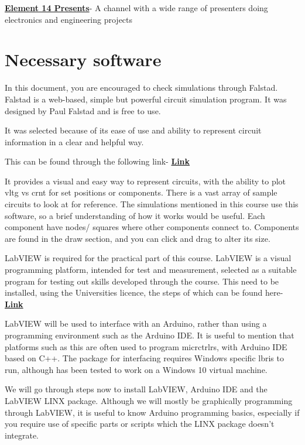 \documentclass[a4paper,11pt]{report}
\let\oldhref\href %
\renewcommand{\href}[2]{\oldhref{#1}{\bfseries#2}}
\begin{document}
\href{https://www.youtube.com/c/element14presents/videos}{Element 14 Presents}- A channel with a wide range of presenters doing electronics and engineering projects

\pagebreak

\section{Necessary software}

In this document, you are encouraged to check simulations through Falstad. Falstad is a web-based, simple but powerful circuit simulation program. It was designed by Paul Falstad and is free to use.

It was selected because of its ease of use and ability to represent circuit information in a clear and helpful way.

This can be found through the following link- \href{https://falstad.com/circuit/}{Link}

It provides a visual and easy way to represent circuits, with the ability to plot \gls{vltg} vs \gls{crnt} for set positions or components. There is a vast array of sample circuits to look at for reference. The simulations mentioned in this course use this software, so a brief understanding of how it works would be useful. Each component have nodes/ squares where other components connect to. Components are found in the draw section, and you can click and drag to alter its size.

LabVIEW is required for the practical part of this course. LabVIEW is a visual programming platform, intended for test and measurement, selected as a suitable program for testing out skills developed through the course. This need to be installed, using the Universities licence, the steps of which can be found here- \href{https://www.york.ac.uk/it-services/software/a-z/labview/}{Link}

LabVIEW will be used to interface with an Arduino, rather than using a programming environment such as the Arduino IDE. It is useful to mention that platforms such as this are often used to program \gls{micrctrlr}s, with Arduino IDE based on C++. The package for interfacing requires Windows specific \gls{lbris} to run, although has been tested to work on a Windows 10 virtual machine.

We will go through steps now to install LabVIEW, Arduino IDE and the LabVIEW LINX package. Although we will mostly be graphically programming through LabVIEW, it is useful to know Arduino programming basics, especially if you require use of specific parts or scripts which the LINX package doesn't integrate.
\end{document}
